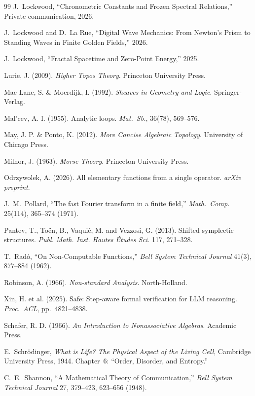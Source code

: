 \documentclass[12pt,oneside]{book}
\begin{document}
\begin{thebibliography}{99}
J.~Lockwood,
``Chronometric Constants and Frozen Spectral Relations,''
Private communication, 2026.

J.~Lockwood and D.~La Rue,
``Digital Wave Mechanics: From Newton's Prism to Standing Waves
in Finite Golden Fields,'' 2026.

J.~Lockwood,
``Fractal Spacetime and Zero-Point Energy,'' 2025.

Lurie, J. (2009). \emph{Higher Topos Theory}. Princeton University Press.

Mac Lane, S. \& Moerdijk, I. (1992). \emph{Sheaves in Geometry and Logic}. Springer-Verlag.

Mal'cev, A. I. (1955). Analytic loops. \emph{Mat.\ Sb.}, 36(78), 569--576.

May, J. P. \& Ponto, K. (2012). \emph{More Concise Algebraic Topology}. University of Chicago Press.

Milnor, J. (1963). \emph{Morse Theory}. Princeton University Press.

Odrzywolek, A. (2026). All elementary functions from a single operator. \emph{arXiv preprint}.

J.~M.~Pollard,
``The fast Fourier transform in a finite field,''
\emph{Math.\ Comp.} 25(114), 365--374 (1971).

Pantev, T., To\"en, B., Vaqui\'e, M. and Vezzosi, G. (2013). Shifted symplectic structures. \emph{Publ. Math. Inst. Hautes \'Etudes Sci.} 117, 271--328.

T.~Rad\'o,
``On Non-Computable Functions,''
\emph{Bell System Technical Journal} 41(3), 877--884 (1962).

Robinson, A. (1966). \emph{Non-standard Analysis}. North-Holland.

Xin, H. et al. (2025). Safe: Step-aware formal verification for LLM reasoning. \emph{Proc.\ ACL}, pp.~4821--4838.

Schafer, R. D. (1966). \emph{An Introduction to Nonassociative Algebras}. Academic Press.

E.~Schr\"odinger,
\emph{What is Life? The Physical Aspect of the Living Cell},
Cambridge University Press, 1944.
Chapter~6: ``Order, Disorder, and Entropy.''

C.~E.~Shannon,
``A Mathematical Theory of Communication,''
\emph{Bell System Technical Journal} 27, 379--423, 623--656 (1948).


\end{thebibliography}
\end{document}
